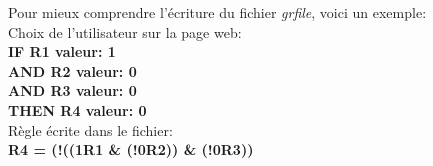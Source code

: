 Pour mieux comprendre l'écriture du fichier \emph{grfile}, voici un exemple:\\
Choix de l'utilisateur sur la page web:\\
\textbf{IF R1 valeur: 1\\
AND R2 valeur: 0\\
AND R3 valeur: 0\\
THEN R4 valeur: 0}\\

Règle écrite dans le fichier: \\
\textbf{R4 = (!((1R1 \& (!0R2)) \& (!0R3))}
